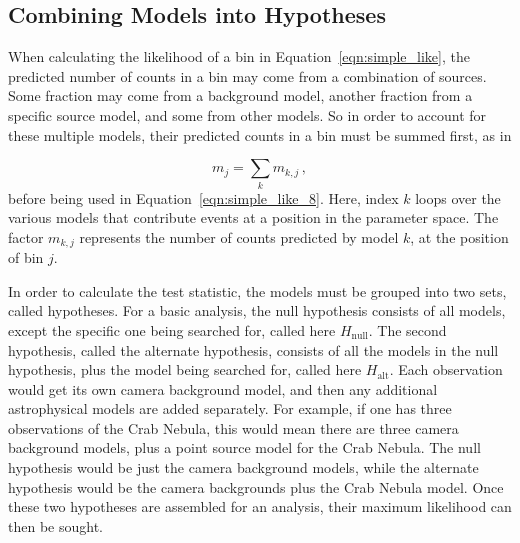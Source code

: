 \subsection{Combining Models into Hypotheses}\label{subsec:hypotheses}

When calculating the likelihood of a bin in Equation~\ref{eqn:simple_like}, the predicted number of counts in a bin may come from a combination of sources.
Some fraction may come from a background model, another fraction from a specific source model, and some from other models.
So in order to account for these multiple models, their predicted counts in a bin must be summed first, as in 

\begin{equation}\label{eqn:combinemodels}
  m_{j} = \sum_k m_{k,j} \,,
\end{equation}
before being used in Equation~\ref{eqn:simple_like_8}.
Here, index $k$ loops over the various models that contribute events at a position in the parameter space.
The factor $m_{k,j}$ represents the number of counts predicted by model $k$, at the position of bin $j$.

In order to calculate the test statistic, the models must be grouped into two sets, called hypotheses.
For a basic analysis, the null hypothesis consists of all models, except the specific one being searched for, called here $H_{\textrm{null}}$.
The second hypothesis, called the alternate hypothesis, consists of all the models in the null hypothesis, plus the model being searched for, called here $H_{\textrm{alt}}$.
Each observation would get its own camera background model, and then any additional astrophysical models are added separately.
For example, if one has three observations of the Crab Nebula, this would mean there are three camera background models, plus a point source model for the Crab Nebula.
The null hypothesis would be just the camera background models, while the alternate hypothesis would be the camera backgrounds plus the Crab Nebula model.
Once these two hypotheses are assembled for an analysis, their maximum likelihood can then be sought.

